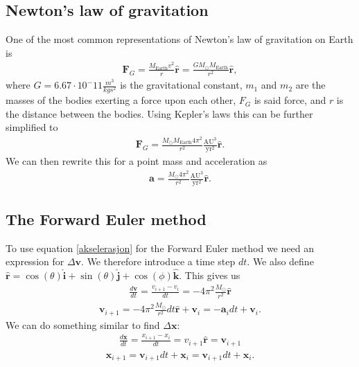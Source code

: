\documentclass[a4paper]{article}
\begin{document}
	\subsection{Newton's law of gravitation}
	One of the most common representations of Newton's law of gravitation on Earth is
	\begin{align}
	\boldsymbol{F}_{G} = \frac{M_{\text{Earth}}v^{2}}{r}\boldsymbol{\hat{r}} = \frac{GM_{\odot} M_{\text{Earth}}}{r^{2}}\boldsymbol{\hat{r}},
	\end{align}
	where $G=6.67\cdot10^-11\frac{m^3}{kgs^2}$ is the gravitational constant, $m_1$ and $m_2$ are the masses of the bodies exerting a force upon each other, $F_G$ is said force, and $r$ is the distance between the bodies. Using Kepler's laws this can be further simplified to
	\begin{align}
	\boldsymbol{F}_G=\frac{{M_{\odot}M_\text{Earth}}4\pi^{2}}{r^{2}}\frac{\mathrm{AU}^{3}}{\mathrm{yr}^{2}}\boldsymbol{\hat{r}}.
	\end{align}
	We can then rewrite this for a point mass and acceleration as
	\begin{align}
	\boldsymbol{a}=\frac{{M_{\odot}}4\pi^{2}}{r^{2}}\frac{\mathrm{AU}^{3}}{\mathrm{yr}^{2}}\boldsymbol{\hat{r}}. \label{akselerasjon}
	\end{align} 
	
	\subsection{The Forward Euler method}
	To use equation \ref{akselerasjon} for the Forward Euler method we need an expression for $\Delta \boldsymbol{v}$. We therefore introduce a time step $dt$. We also define $\boldsymbol{\hat{r}}=\cos(\theta)\boldsymbol{\hat{i}}+\sin(\theta)\boldsymbol{\hat{j}}+\cos(\phi)\boldsymbol{\hat{k}}$. This gives us
	\begin{align*}
	\frac{d\boldsymbol{v}}{dt}=\frac{v_{i+1}-v_i}{dt}=-4\pi^2\frac{M_{\odot}}{r^2}\boldsymbol{\hat{r}}
	\end{align*}
	\begin{align}
	\boldsymbol{v}_{i+1}=-4\pi^2\frac{M_\odot}{r^2}dt\boldsymbol{\hat{r}} + \boldsymbol{v}_i 
	= -\boldsymbol{a}_i dt  + \boldsymbol{v}_i.
	\end{align}
	We can do something similar to find $\Delta \boldsymbol{x}$:
	\begin{align*}
	\frac{d\boldsymbol{x}}{dt}=\frac{x_{i+1}-x_i}{dt} = v_{i+1}\boldsymbol{\hat{r}} = \boldsymbol{v}_{i+1}
	\end{align*}
	\begin{align}
	\boldsymbol{x}_{i+1}= \boldsymbol{v}_{i+1}dt + \boldsymbol{x}_i 
	= \boldsymbol{v}_{i+1} dt  + \boldsymbol{x}_i.
	\end{align}
	
\end{document}
